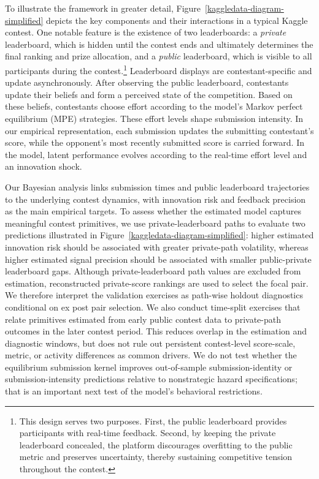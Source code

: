 \documentclass[mnsc]{informs3}
\begin{document}
To illustrate the framework in greater detail, Figure~\ref{kaggledata-diagram-simplified} depicts the key components and their interactions in a typical Kaggle contest.
One notable feature is the existence of two leaderboards: a \textit{private} leaderboard, which is hidden until the contest ends and ultimately determines the final ranking and prize allocation, and a \textit{public} leaderboard, which is visible to all participants during the contest.\footnote{
This design serves two purposes.
First, the public leaderboard provides participants with real-time feedback.
Second, by keeping the private leaderboard concealed, the platform discourages overfitting to the public metric \citep[see also][]{blum2015ladder} and preserves uncertainty, thereby sustaining competitive tension throughout the contest.
}
Leaderboard displays are contestant-specific and update asynchronously.
After observing the public leaderboard, contestants update their beliefs and form a perceived state of the competition.
Based on these beliefs, contestants choose effort according to the model’s Markov perfect equilibrium (MPE) strategies.
These effort levels shape submission intensity. 
In our empirical representation, each submission updates the submitting contestant's score, while the opponent's most recently submitted score is carried forward.
In the model, latent performance evolves according to the real-time effort level and an innovation shock.


Our Bayesian analysis links submission times and public leaderboard trajectories to the underlying contest dynamics, with innovation risk and feedback precision as the main empirical targets.
To assess whether the estimated model captures meaningful contest primitives, we use private-leaderboard paths to evaluate two predictions illustrated in Figure~\ref{kaggledata-diagram-simplified}: 
higher estimated innovation risk should be associated with greater private-path volatility, 
whereas higher estimated signal precision should be associated with smaller public-private leaderboard gaps. 
Although private-leaderboard path values are excluded from estimation, reconstructed private-score rankings are used to select the focal pair. We therefore interpret the validation exercises as path-wise holdout diagnostics conditional on ex post pair selection.
We also conduct time-split exercises that relate primitives estimated from early public contest data to private-path outcomes in the later contest period. This reduces overlap in the estimation and diagnostic windows, but does not rule out persistent contest-level score-scale, metric, or activity differences as common drivers. We do not test whether the equilibrium submission kernel improves out-of-sample submission-identity or submission-intensity predictions relative to nonstrategic hazard specifications; that is an important next test of the model's behavioral restrictions.
\end{document}
